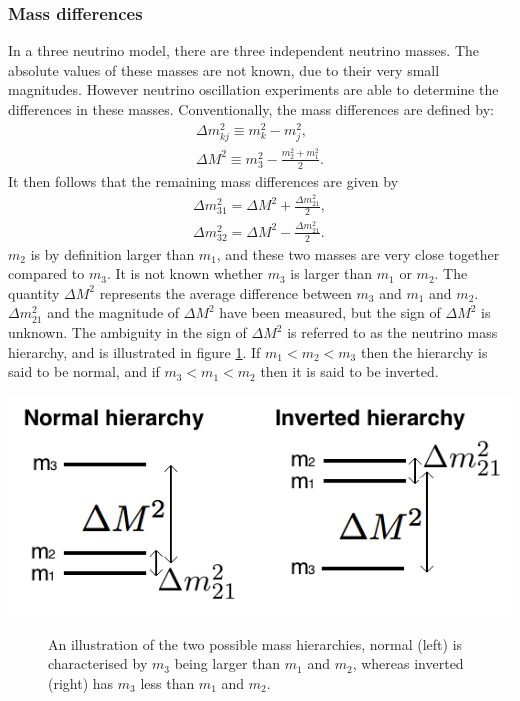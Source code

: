 \documentclass[12pt]{article}
\begin{document}
\subsubsection{Mass differences}
In a three neutrino model, there are three independent neutrino masses. The absolute values of these masses are not known, due to their very small magnitudes. However neutrino oscillation experiments are able to determine the differences in these masses. Conventionally, the mass differences are defined by\cite{PDG}:
\begin{align}
\Delta m_{kj}^2\equiv m_{k}^2-m_{j}^2,\\
\Delta M^2\equiv m_3^2-\frac{m_2^2+m_1^2}{2}.
\end{align}
It then follows that the remaining mass differences are given by
\begin{align}
\Delta m_{31}^2= \Delta M^2 +\frac{\Delta m_{21}^2}{2},\\
\Delta m_{32}^2= \Delta M^2 -\frac{\Delta m_{21}^2}{2}.
\end{align}
$m_2$ is by definition larger than $m_1$, and these two masses are very close together compared to $m_3$. It is not known whether $m_3$ is larger than $m_1$ or $m_2$. The quantity $\Delta M^2$ represents the average difference between $m_3$ and $m_1$ and $m_2$. $\Delta m_{21}^2$ and the magnitude of $\Delta M^2$ have been measured, but the sign of $\Delta M^2$ is unknown. The ambiguity in the sign of $\Delta M^2$ is referred to as the neutrino mass hierarchy, and is illustrated in figure \ref{fig:hierarchy_demo}. If $m_1<m_2<m_3$ then the hierarchy is said to be normal, and if $m_3<m_1<m_2$ then it is said to be inverted.
\begin{center}
\includegraphics[scale=0.4]{hierarchy_demo.png}
\begin{figure}[h!]
\caption{An illustration of the two possible mass hierarchies, normal (left) is characterised by $m_3$ being larger than $m_1$ and $m_2$, whereas inverted (right) has $m_3$ less than $m_1$ and $m_2$.}
\label{fig:hierarchy_demo}
\end{figure}
\end{center}
\end{document}
